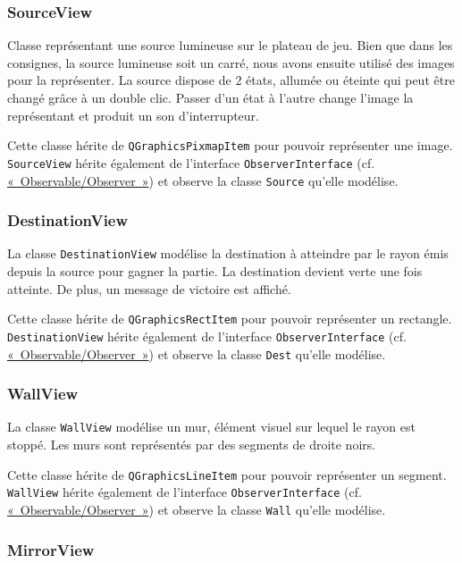\documentclass[]{report}
\begin{document}
\subsubsection{\label{SourceView}SourceView}

Classe représentant une source lumineuse sur le plateau de jeu. Bien que dans les consignes, la source lumineuse soit un carré, nous avons ensuite utilisé des images pour la représenter.
La source dispose de 2 états, allumée ou éteinte qui peut être changé grâce à un double clic.
Passer d’un état à l’autre change l’image la représentant et produit un son d’interrupteur.

Cette classe hérite de \texttt{QGraphicsPixmapItem} pour pouvoir représenter une image.
\texttt{SourceView} hérite également de l'interface \texttt{ObserverInterface} (cf. \hyperref[OO]{«~Observable/Observer~»}) et observe
la classe \texttt{Source} qu'elle modélise.

\subsubsection{\label{DestinationView}DestinationView}

La classe \texttt{DestinationView} modélise la destination à atteindre par le rayon émis depuis la source pour gagner la partie.
La destination devient verte une fois atteinte. De plus, un message de victoire est affiché.

Cette classe hérite de \texttt{QGraphicsRectItem} pour pouvoir représenter un rectangle.
\texttt{DestinationView} hérite également de l'interface \texttt{ObserverInterface} (cf. \hyperref[OO]{«~Observable/Observer~»}) et observe
la classe \texttt{Dest} qu'elle modélise.

\subsubsection{\label{WallView}WallView}

La classe \texttt{WallView} modélise un mur, élément visuel sur lequel le rayon est stoppé. 
Les murs sont représentés par des segments de droite noirs.

Cette classe hérite de \texttt{QGraphicsLineItem} pour pouvoir représenter un segment.
\texttt{WallView} hérite également de l'interface \texttt{ObserverInterface} (cf. \hyperref[OO]{«~Observable/Observer~»}) et observe
la classe \texttt{Wall} qu'elle modélise.

\subsubsection{\label{MirrorView}MirrorView}
\end{document}
